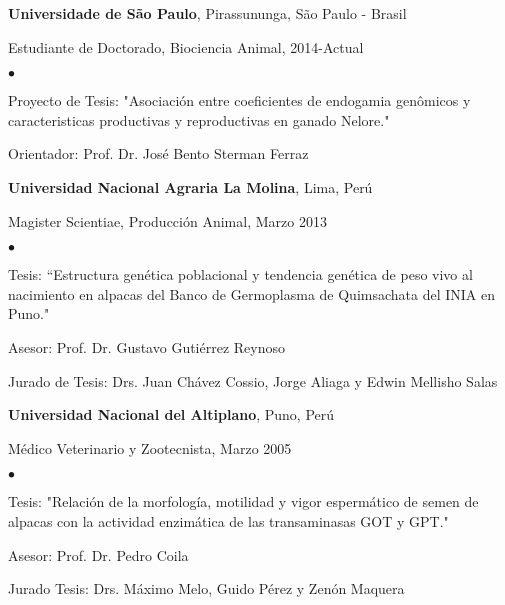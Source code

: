 \documentclass[margin,line,10pt]{res}
\newenvironment{list1}{
  \begin{list}{\ding{113}}{%
      \setlength{\itemsep}{0in}
      \setlength{\parsep}{0in} \setlength{\parskip}{0in}
      \setlength{\topsep}{0in} \setlength{\partopsep}{0in} 
      \setlength{\leftmargin}{0.17in}}}{\end{list}}
\newenvironment{list2}{
  \begin{list}{$\bullet$}{%
      \setlength{\itemsep}{0in}
      \setlength{\parsep}{0in} \setlength{\parskip}{0in}
      \setlength{\topsep}{0in} \setlength{\partopsep}{0in} 
      \setlength{\leftmargin}{0.2in}}}{\end{list}}
\begin{document}
\begin{resume}
{\bf Universidade de São Paulo}, Pirassununga, São Paulo - Brasil\\
\vspace*{-.1in}
\begin{list1}
\item[] Estudiante de Doctorado, Biociencia Animal, 2014-Actual
\begin{list2}
\vspace*{.05in}
\item Proyecto de Tesis: "Asociación entre coeficientes de endogamia genômicos y caracteristicas productivas y reproductivas en ganado Nelore." 
\item Orientador: Prof. Dr. José Bento Sterman Ferraz 
\end{list2}
\vspace*{.05in}
\end{list1}

{\bf Universidad Nacional Agraria La Molina}, Lima, Perú\\
\vspace*{-.1in}
\begin{list1}
\item[] Magister Scientiae, Producción Animal, Marzo 2013
\begin{list2}
\vspace*{.05in}
\item Tesis: ``Estructura genética poblacional y tendencia genética de peso vivo al nacimiento en alpacas del Banco de Germoplasma de Quimsachata del INIA en Puno." 
\item Asesor: Prof. Dr. Gustavo Gutiérrez Reynoso 
\item Jurado de Tesis: Drs. Juan Chávez Cossio, Jorge Aliaga y Edwin Mellisho Salas
\end{list2}
\vspace*{.05in}
\end{list1}


{\bf Universidad Nacional del Altiplano}, Puno, Perú\\
\vspace*{-.1in}
\begin{list1}
\item[] Médico Veterinario y Zootecnista,  Marzo 2005
\begin{list2}
\vspace*{.05in}
\item Tesis:  "Relación de la morfología, motilidad y vigor espermático de semen de alpacas con la actividad enzimática de las transaminasas GOT y GPT." 
\item Asesor: Prof. Dr. Pedro Coila 
\item Jurado Tesis: Drs. Máximo Melo, Guido Pérez y Zenón Maquera
\end{list2}
\end{list1}


\end{resume}
\end{document}
